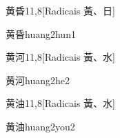 \begin{entry}{黄昏}{11,8}[Radicais ⿈、⽇]
  \begin{phonetics}{黄昏}{huang2hun1}
  \end{phonetics}
\end{entry}

\begin{entry}{黄河}{11,8}[Radicais ⿈、⽔]
  \begin{phonetics}{黄河}{huang2he2}
  \end{phonetics}
\end{entry}

\begin{entry}{黄油}{11,8}[Radicais ⿈、⽔]
  \begin{phonetics}{黄油}{huang2you2}
  \end{phonetics}
\end{entry}


